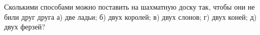 \question 
Сколькими способами можно поставить на шахматную доску так, чтобы они не били друг друга а) две ладьи; б) двух королей; в) двух слонов; г) двух коней; д) двух ферзей?
